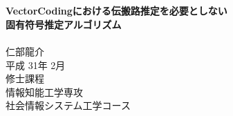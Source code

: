 \documentclass[11pt,oneside,titlepage]{jsbook}
\begin{document}
\captiondelim{ }%
\rhead{\textbf{\thepage}}　　　%
\cfoot{}　　　　　　　　　　　%
\renewcommand{\headrulewidth}{0.4pt}
\renewcommand{\footrulewidth}{0.4pt}
\setlength{\baselineskip}{18.95pt}

\makeatletter
\renewcommand{\chapter}{
  \if@openright\cleardoublepage\else\clearpage\fi
  \global\@topnum\z@
  \secdef\@chapter\@schapter}
\makeatother

\vspace*{3cm}%
\begin{center}%
{\Large \textbf{}}\\%
\vspace{3mm}
{\Large \textbf{VectorCodingにおける伝搬路推定を必要としない\\固有符号推定アルゴリズム}} \\
\vspace{5cm}%
\indent \\
{\Large 仁部龍介} \\
\vspace{5mm}
{\Large 平成 31年 2月} \\
\vspace{5mm}
{\Large 修士課程 \\ 情報知能工学専攻 \\ 社会情報システム工学コース} \\
\end{center}%
\thispagestyle{empty}%


%

\frontmatter %
\clearpage %
\tableofcontents %
\rhead{}

\mainmatter %

\newpage
\rhead{\thepage}






\backmatter          %


%     　　
\end{document}
